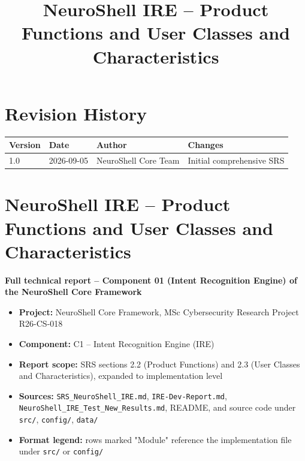 \documentclass[10pt,journal,onecolumn]{IEEEtran}
\begin{document}
\title{NeuroShell IRE -- Product Functions and User Classes and Characteristics}
\author{
}

\maketitle

\section*{Revision History}
\begin{center}
\begin{tabularx}{0.9\columnwidth}{l l l X}
\toprule
\textbf{Version} & \textbf{Date} & \textbf{Author} & \textbf{Changes}\\
\midrule
1.0 & 2026-09-05 & NeuroShell Core Team & Initial comprehensive SRS\\
\bottomrule
\end{tabularx}
\end{center}

\tableofcontents

\newpage
\section{NeuroShell IRE -- Product Functions and User Classes and Characteristics}

\textbf{Full technical report -- Component 01 (Intent Recognition Engine) of the NeuroShell Core Framework}

\begin{itemize}
\item \textbf{Project:} NeuroShell Core Framework, MSc Cybersecurity Research Project R26-CS-018
\item \textbf{Component:} C1 -- Intent Recognition Engine (IRE)
\item \textbf{Report scope:} SRS sections 2.2 (Product Functions) and 2.3 (User Classes and Characteristics), expanded to implementation level
\item \textbf{Sources:} \texttt{SRS\_NeuroShell\_IRE.md}, \texttt{IRE-Dev-Report.md}, \texttt{NeuroShell\_\allowbreak IRE\_\allowbreak Test\_\allowbreak New\_\allowbreak Results.\allowbreak md}, README, and source code under \texttt{src/}, \texttt{config/}, \texttt{data/}
\item \textbf{Format legend:} rows marked "Module" reference the implementation file under \texttt{src/} or \texttt{config/}
\end{itemize}
\end{document}
